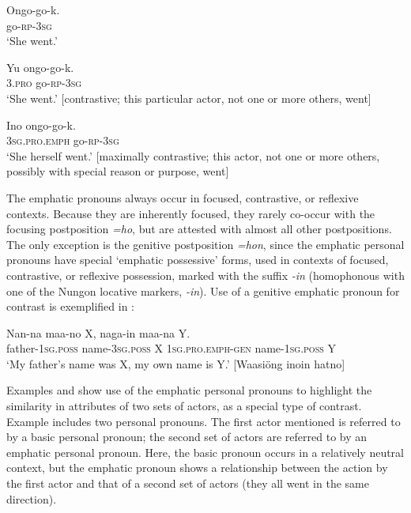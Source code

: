\documentclass[output=paper,colorlinks,citecolor=brown]{langscibook}
\begin{document}
\ea%
    \label{ex:sarvasy:1}
    \gll    Ongo-go-k.\\
            go-\textsc{rp-3sg}\\
    \glt    ‘She went.’
\z

\ea%
    \label{ex:sarvasy:2}
    \gll    Yu ongo-go-k.\\
            \textsc{3.pro}  go-\textsc{rp-3sg}\\
    \glt    ‘She went.’ [contrastive; this particular actor, not one or more others, went]
\z

\ea%
    \label{ex:sarvasy:3}
    \gll    Ino ongo-go-k.\\
            \textsc{3sg.pro.emph} go-\textsc{rp-3sg}\\
    \glt    ‘She herself went.’ [maximally contrastive; this actor, not one or more others, possibly with special reason or purpose, went]
\z

The emphatic pronouns always occur in focused, contrastive, or reflexive contexts. Because they are inherently focused, they rarely co-occur with the focusing postposition \textit{=ho}, but are attested with almost all other postpositions. The only exception is the genitive postposition \textit{=hon}, since the emphatic personal pronouns have special ‘emphatic possessive’ forms, used in contexts of focused, contrastive, or reflexive possession, marked with the suffix \textit{{}-in} (homophonous with one of the Nungon locative markers, \textit{{}-in}). Use of a genitive emphatic pronoun for contrast is exemplified in : 

\ea%
    \label{ex:sarvasy:4}
    \gll    Nan-na maa-no X, naga-in maa-na Y.\\
            father-\textsc{1sg.poss}  name-\textsc{3sg.poss}  X  \textsc{1sg.pro.emph-gen}  name-\textsc{1sg.poss} \textsc{Y}\\
    \glt    ‘My father’s name was X, my own name is Y.’ [Waasiöng inoin hatno]
\z

 Examples  and  show use of the emphatic personal pronouns to highlight the similarity in attributes of two sets of actors, as a special type of contrast. Example  includes two personal pronouns. The first actor mentioned is referred to by a basic personal pronoun; the second set of actors are referred to by an emphatic personal pronoun. Here, the basic pronoun occurs in a relatively neutral context, but the emphatic pronoun shows a relationship between the action by the first actor and that of a second set of actors (they all went in the same direction). 
\end{document}
